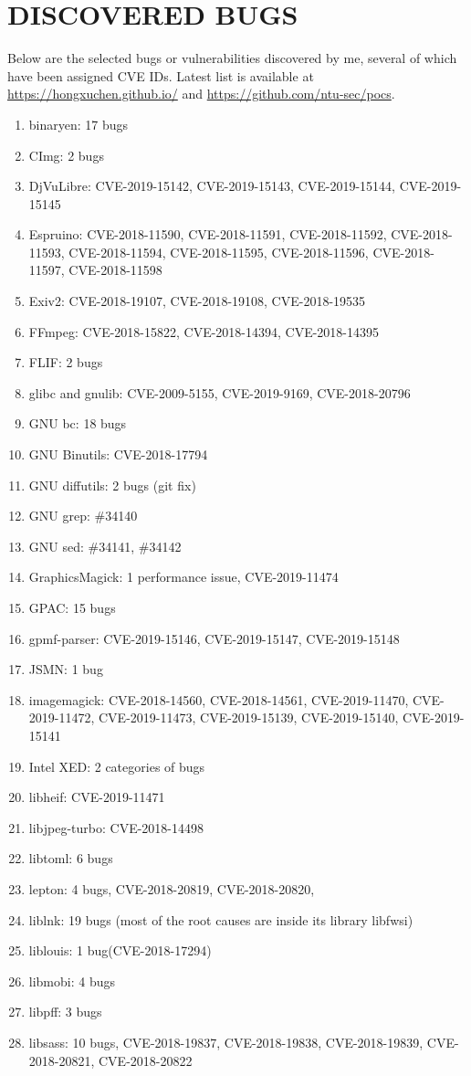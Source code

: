 \documentclass[paper=a4,fontsize=11pt]{article} %
\newcommand{\NewPart}[1]{\section*{\uppercase{#1}}}
\begin{document}
\NewPart{Discovered Bugs}
Below are the selected bugs or vulnerabilities discovered by me, several of which have been assigned CVE IDs. Latest list is available at \url{https://hongxuchen.github.io/} and \url{https://github.com/ntu-sec/pocs}.
\begin{enumerate}
    \item binaryen: 17 bugs
    \item CImg: 2 bugs
    \item DjVuLibre: CVE-2019-15142, CVE-2019-15143, CVE-2019-15144, CVE-2019-15145
    \item Espruino: CVE-2018-11590, CVE-2018-11591, CVE-2018-11592, CVE-2018-11593, CVE-2018-11594, CVE-2018-11595, CVE-2018-11596, CVE-2018-11597, CVE-2018-11598
    \item Exiv2: CVE-2018-19107, CVE-2018-19108, CVE-2018-19535
    \item FFmpeg: CVE-2018-15822, CVE-2018-14394, CVE-2018-14395
    \item FLIF: 2 bugs
    \item glibc and gnulib: CVE-2009-5155, CVE-2019-9169, CVE-2018-20796
    \item GNU bc: 18 bugs
    \item GNU Binutils: CVE-2018-17794
    \item GNU diffutils: 2 bugs (git fix)
    \item GNU grep: \#34140
    \item GNU sed: \#34141, \#34142
    \item GraphicsMagick: 1 performance issue, CVE-2019-11474
    \item GPAC: 15 bugs
    \item gpmf-parser: CVE-2019-15146, CVE-2019-15147, CVE-2019-15148
    \item JSMN: 1 bug
    \item imagemagick: CVE-2018-14560, CVE-2018-14561, CVE-2019-11470, CVE-2019-11472, CVE-2019-11473, CVE-2019-15139, CVE-2019-15140, CVE-2019-15141
    \item Intel XED: 2 categories of bugs
    \item libheif: CVE-2019-11471
    \item libjpeg-turbo: CVE-2018-14498
    \item libtoml: 6 bugs
    \item lepton: 4 bugs, CVE-2018-20819, CVE-2018-20820,
    \item liblnk: 19 bugs (most of the root causes are inside its library libfwsi)
    \item liblouis: 1 bug(CVE-2018-17294)
    \item libmobi: 4 bugs
    \item libpff: 3 bugs
    \item libsass: 10 bugs, CVE-2018-19837, CVE-2018-19838, CVE-2018-19839, CVE-2018-20821, CVE-2018-20822
\end{enumerate}
\end{document}
